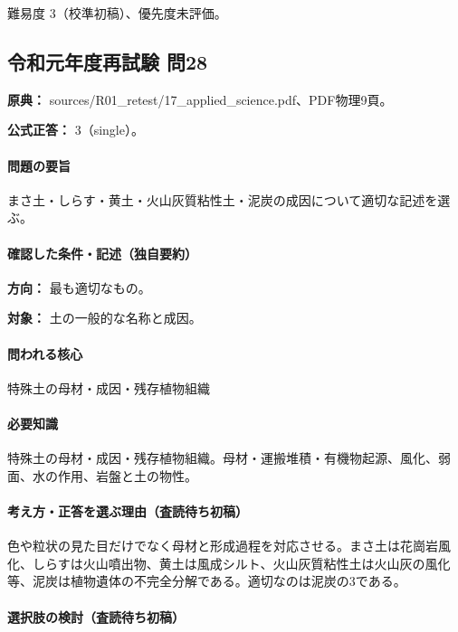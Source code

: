 \par 難易度 3（校準初稿）、優先度未評価。

\subsection{令和元年度再試験 問28}
\label{q:r01-ret-applied-28}

\noindent\textbf{原典：} sources/R01\_retest/17\_applied\_science.pdf、PDF物理9頁。

\textbf{公式正答：} 3（single）。

\paragraph{問題の要旨} まさ土・しらす・黄土・火山灰質粘性土・泥炭の成因について適切な記述を選ぶ。

\paragraph{確認した条件・記述（独自要約）}\mbox{}\par

\noindent\textbf{方向：} 最も適切なもの。\par

\noindent\textbf{対象：} 土の一般的な名称と成因。\par

\paragraph{問われる核心} 特殊土の母材・成因・残存植物組織

\paragraph{必要知識} 特殊土の母材・成因・残存植物組織。母材・運搬堆積・有機物起源、風化、弱面、水の作用、岩盤と土の物性。

\paragraph{考え方・正答を選ぶ理由（査読待ち初稿）} 色や粒状の見た目だけでなく母材と形成過程を対応させる。まさ土は花崗岩風化、しらすは火山噴出物、黄土は風成シルト、火山灰質粘性土は火山灰の風化等、泥炭は植物遺体の不完全分解である。適切なのは泥炭の3である。

\paragraph{選択肢の検討（査読待ち初稿）}\mbox{}\par

